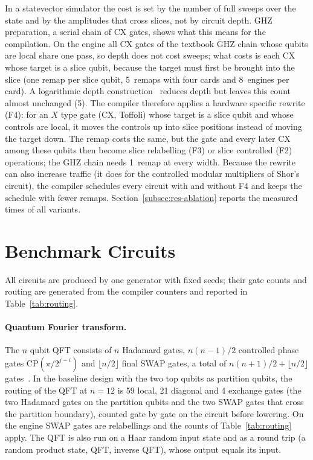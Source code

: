 \documentclass[pdflatex,sn-mathphys-num]{sn-jnl}
\newcommand{\NumEnginesFlagship}{8}
\newcommand{\NumGhzChainRemapsFfour}{1}
\newcommand{\NumGhzChainRemapsNoFfour}{5}
\newcommand{\NumGhzLogRemapsNoFfour}{5}
\theoremstyle{thmstyleone}
\theoremstyle{thmstylethree}
\begin{document}
In a statevector simulator the cost is set by the number of full sweeps over the state and by the amplitudes that
cross slices, not by circuit depth. GHZ preparation, a serial chain of CX gates, shows what this means for the
compilation. On the engine all CX gates of the textbook GHZ chain whose qubits are local
share one pass, so depth does not cost sweeps; what costs is each CX whose target is a slice qubit, because the
target must first be brought into the slice (one remap per slice qubit, \NumGhzChainRemapsNoFfour~remaps with four
cards and \NumEnginesFlagship~engines per card). A logarithmic depth construction~\cite{cruz2019efficient} reduces depth but
leaves this count almost unchanged (\NumGhzLogRemapsNoFfour). The compiler therefore applies a hardware specific
rewrite (F4): for an $X$ type gate (CX, Toffoli) whose target is a slice qubit and whose controls are local, it moves
the controls up into slice positions instead of moving the target down. The remap costs the same, but the gate and
every later CX among these qubits then become slice relabelling (F3) or slice controlled (F2) operations; the GHZ
chain needs \NumGhzChainRemapsFfour~remap at every width. Because the rewrite can also increase traffic (it does for
the controlled modular multipliers of Shor's circuit), the compiler schedules every circuit with and without F4 and
keeps the schedule with fewer remaps. Section~\ref{subsec:res-ablation} reports the measured times of all variants.
\section{Benchmark Circuits}\label{sec:algorithms}

All circuits are produced by one generator with fixed seeds; their gate counts and routing are generated from the
compiler counters and reported in Table~\ref{tab:routing}.

\paragraph{Quantum Fourier transform.} The $n$ qubit QFT consists of $n$ Hadamard gates, $n(n-1)/2$ controlled phase
gates $\mathrm{CP}(\pi/2^{j-i})$ and $\lfloor n/2\rfloor$ final SWAP gates, a total of $n(n+1)/2 + \lfloor n/2\rfloor$
gates~\cite{nielsen2010quantum}. In the baseline design with the two top qubits as partition qubits, the routing of
the QFT at $n=12$ is 59 local, 21 diagonal and 4 exchange gates (the two Hadamard gates on the partition qubits and the
two SWAP gates that cross the partition boundary), counted gate by gate on the circuit before lowering. On the engine
SWAP gates are relabellings and the counts of Table~\ref{tab:routing} apply. The QFT is also run on a Haar random input state and as a round trip (a random
product state, QFT, inverse QFT), whose output equals its input.
\end{document}
